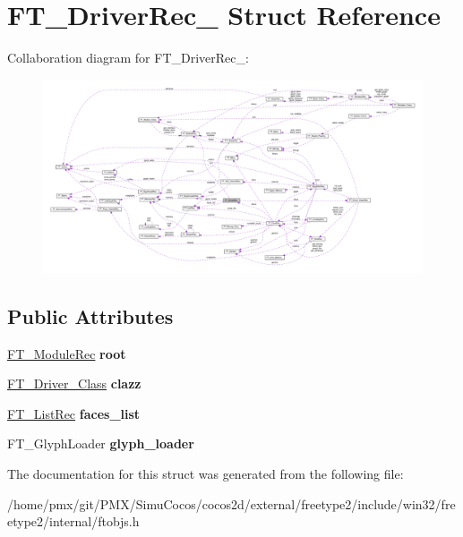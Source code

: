 \hypertarget{structFT__DriverRec__}{}\section{F\+T\+\_\+\+Driver\+Rec\+\_\+ Struct Reference}
\label{structFT__DriverRec__}


Collaboration diagram for F\+T\+\_\+\+Driver\+Rec\+\_\+\+:
\nopagebreak
\begin{figure}[H]
\begin{center}
\leavevmode
\includegraphics[width=350pt]{structFT__DriverRec____coll__graph}
\end{center}
\end{figure}
\subsection*{Public Attributes}
\begin{DoxyCompactItemize}
\item 
\mbox{\label{structFT__DriverRec___a8451ceb25c76794fb47e81f477c8222d}} 
\hyperlink{structFT__ModuleRec__}{F\+T\+\_\+\+Module\+Rec} {\bfseries root}
\item 
\mbox{\label{structFT__DriverRec___a3111153608e5abeb093ed5eb7fef5aec}} 
\hyperlink{structFT__Driver__ClassRec__}{F\+T\+\_\+\+Driver\+\_\+\+Class} {\bfseries clazz}
\item 
\mbox{\label{structFT__DriverRec___a2602170e3ecde21a764dc32417aaa002}} 
\hyperlink{structFT__ListRec__}{F\+T\+\_\+\+List\+Rec} {\bfseries faces\+\_\+list}
\item 
\mbox{\label{structFT__DriverRec___ac28e7adbc14ee82c2b7710d0ee5541e2}} 
F\+T\+\_\+\+Glyph\+Loader {\bfseries glyph\+\_\+loader}
\end{DoxyCompactItemize}


The documentation for this struct was generated from the following file\+:\begin{DoxyCompactItemize}
\item 
/home/pmx/git/\+P\+M\+X/\+Simu\+Cocos/cocos2d/external/freetype2/include/win32/freetype2/internal/ftobjs.\+h\end{DoxyCompactItemize}
